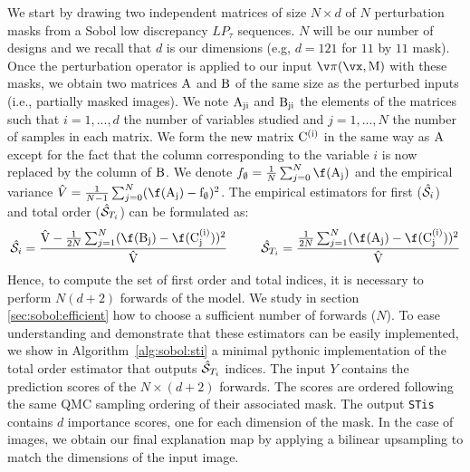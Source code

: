 We start by drawing two independent matrices of size $N \times d$ of $N$ perturbation masks from a Sobol low discrepancy $LP_{\tau}$ sequences.
$N$ will be our number of designs and we recall that $d$ is our dimensions (e.g, $d=121$ for $11$ by $11$ mask).
Once the perturbation operator is applied to our input $\perturbation(\vx, \rm{M})$ with these masks, we obtain two matrices $\rm{A}$ and $\rm{B}$ of the same size as the perturbed inputs (i.e., partially masked images). We note $\rm{A}_{ji}$ and $\rm{B}_{ji}$ the elements of the matrices such that $i = 1, ..., d$ the number of variables studied and $j = 1, ..., N$ the number of samples in each matrix.
We form the new matrix $\rm{C}^{(i)}$ in the same way as $\rm{A}$ except for the fact that the column corresponding to the variable $i$ is now replaced by the column of $\rm{B}$.
We denote $f_{\emptyset} = \frac{1}{N} \sum_{j=0}^N \f(\estA_j)$ and the empirical variance $\hat{V} = \frac{1}{N-1} \sum_{j=0}^N (\f(\estA_j) - f_{\emptyset})^2 $. The empirical estimators for first ($\hat{\mathcal{S}}_i$) and total order ($\hat{\mathcal{S}}_{T_i}$) can be formulated as:
\vspace{-1mm}
\begin{equation}
\label{eq:jansen_estimator}
        \hat{\sob}_i = \frac
        { \Vemp - \frac{1}{2N} \sum_{j=1}^N (\f(\estB_j) - \f(\estAB_j^{(i)}))^2 }
        { \Vemp }
        \text{ }\text{ }\text{ }\text{ }\text{ }\text{ }\text{ }\text{ }
        \hat{\sob}_{T_i} = \frac
        { \frac{1}{2N} \sum_{j=1}^N ( \f(\estA_j) - \f(\estAB_j^{(i)}) )^2  }
        { \Vemp } \\
\end{equation}
Hence, to compute the set of first order and total indices, it is necessary to perform $N(d+2)$ forwards of the model. We study in section \ref{sec:sobol:efficient} how to choose a sufficient number of forwards ($N$).
To ease understanding and demonstrate that these estimators can be easily implemented, we show in Algorithm~\ref{alg:sobol:sti} a minimal pythonic implementation of the total order estimator that outputs $\hat{\mathcal{S}}_{T_i}$ indices. The input $Y$ contains the prediction scores of the $N \times (d+2)$ forwards. The scores are ordered following the same QMC sampling ordering of their associated mask. The output \texttt{STis} contains $d$ importance scores, one for each dimension of the mask. In the case of images, we obtain our final explanation map by applying a bilinear upsampling to match the dimensions of the input image.

